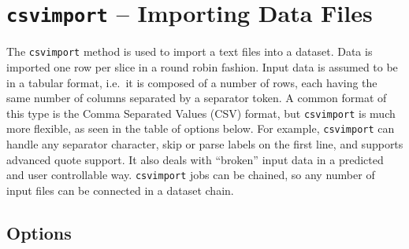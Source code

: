 


\section{\texttt{csvimport} -- Importing Data Files}
The \texttt{csvimport} method is used to import a text files into a
dataset.  Data is imported one row per slice in a round robin fashion.
Input data is assumed to be in a tabular format, i.e.\ it is composed
of a number of rows, each having the same number of columns separated
by a separator token.  A common format of this type is the Comma
Separated Values (CSV) format, but \texttt{csvimport} is much more
flexible, as seen in the table of options below.  For example,
\texttt{csvimport} can handle any separator character, skip or parse
labels on the first line, and supports advanced quote support.  It
also deals with ``broken'' input data in a predicted and user
controllable way.  \texttt{csvimport} jobs can be chained, so any
number of input files can be connected in a dataset chain.



\subsection{Options}
\starttable

